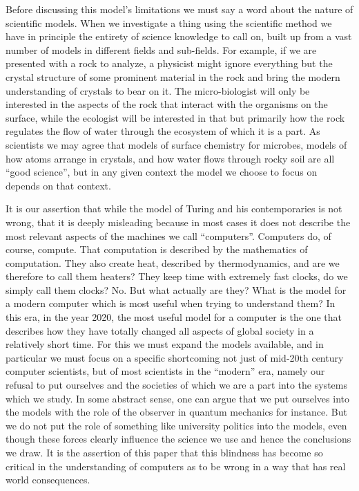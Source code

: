 \documentclass[12pt,a4paper]{amsart}
\numberwithin{equation}{section}
\begin{document}
Before discussing this model's limitations we must say a word about the
nature of scientific models. When we investigate a thing using the
scientific method we have in principle the entirety of science knowledge
to call on, built up from a vast number of models in different fields
and sub-fields. For example, if we are presented with a rock to analyze,
a physicist might ignore everything but the crystal structure of some
prominent material in the rock and bring the modern understanding of
crystals to bear on it. The micro-biologist will only be interested in
the aspects of the rock that interact with the organisms on the surface,
while the ecologist will be interested in that but primarily how the
rock regulates the flow of water through the ecosystem of which it is a
part. As scientists we may agree that models of surface chemistry for
microbes, models of how atoms arrange in crystals, and how water flows
through rocky soil are all ``good science'', but in any given context
the model we choose to focus on depends on that context.

It is our assertion that while the model of Turing and his
contemporaries is not wrong, that it is deeply misleading because in
most cases it does not describe the most relevant aspects of the
machines we call ``computers''. Computers do, of course, compute. That
computation is described by the mathematics of computation. They also
create heat, described by thermodynamics, and are we therefore to call
them heaters? They keep time with extremely fast clocks, do we simply
call them clocks? No. But what actually are they? What is the model for
a modern computer which is most useful when trying to understand them?
In this era, in the year 2020, the most useful model for a computer is
the one that describes how they have totally changed all aspects of
global society in a relatively short time. For this we must expand the
models available, and in particular we must focus on a specific
shortcoming not just of mid-20th century computer scientists, but of
most scientists in the ``modern'' era, namely our refusal to put
ourselves and the societies of which we are a part into the systems
which we study. In some abstract sense, one can argue that we put
ourselves into the models with the role of the observer in quantum
mechanics for instance. But we do not put the role of something like
university politics into the models, even though these forces clearly
influence the science we use and hence the conclusions we draw. It is
the assertion of this paper that this blindness has become so critical
in the understanding of computers as to be wrong in a way that has real
world consequences.
\end{document}
